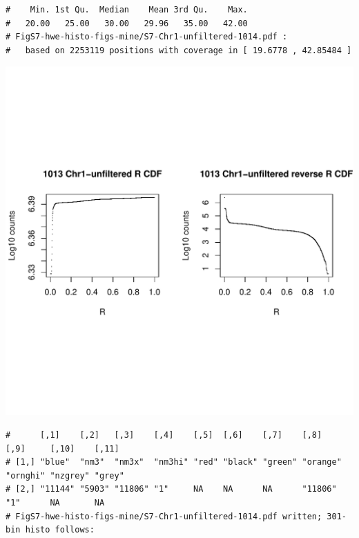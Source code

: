 \documentclass{article}\usepackage[]{graphicx}\usepackage[]{color}
\makeatletter
\def\maxwidth{ %
  \ifdim\Gin@nat@width>\linewidth
    \linewidth
  \else
    \Gin@nat@width
  \fi
}
\newenvironment{kframe}{%
 \def\at@end@of@kframe{}%
 \ifinner\ifhmode%
  \def\at@end@of@kframe{\end{minipage}}%
  \begin{minipage}{\columnwidth}%
 \fi\fi%
 \def\FrameCommand##1{\hskip\@totalleftmargin \hskip-\fboxsep
 \colorbox{shadecolor}{##1}\hskip-\fboxsep
     \hskip-\linewidth \hskip-\@totalleftmargin \hskip\columnwidth}%
 \MakeFramed {\advance\hsize-\width
   \@totalleftmargin\z@ \linewidth\hsize
   \@setminipage}}%
 {\par\unskip\endMakeFramed%
 \at@end@of@kframe}
\newenvironment{knitrout}{}{} %
\makeatother
\begin{document}
\begin{knitrout}
\begin{kframe}
\begin{verbatim}
#    Min. 1st Qu.  Median    Mean 3rd Qu.    Max. 
#   20.00   25.00   30.00   29.96   35.00   42.00 
# FigS7-hwe-histo-figs-mine/S7-Chr1-unfiltered-1014.pdf :
#   based on 2253119 positions with coverage in [ 19.6778 , 42.85484 ]
\end{verbatim}
\end{kframe}
\includegraphics[width=\maxwidth]{FigS7-hwe-histo-figs-knitr/unnamed-chunk-10-20} 
\begin{kframe}\begin{verbatim}
#      [,1]    [,2]   [,3]    [,4]    [,5]  [,6]    [,7]    [,8]     [,9]     [,10]    [,11] 
# [1,] "blue"  "nm3"  "nm3x"  "nm3hi" "red" "black" "green" "orange" "ornghi" "nzgrey" "grey"
# [2,] "11144" "5903" "11806" "1"     NA    NA      NA      "11806"  "1"      NA       NA    
# FigS7-hwe-histo-figs-mine/S7-Chr1-unfiltered-1014.pdf written; 301-bin histo follows:
\end{verbatim}
\end{kframe}

\end{knitrout}
\end{document}
